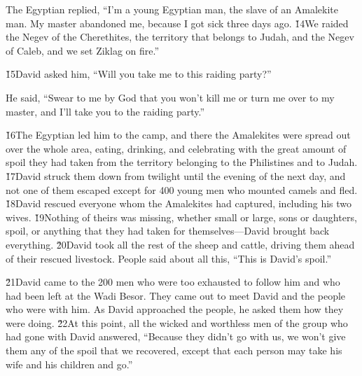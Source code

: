 The Egyptian replied, ``I'm a young Egyptian man, the slave of an Amalekite man. My master abandoned me, because I got sick three days ago. \v{14}We raided the Negev of the Cherethites, the territory that belongs to Judah, and the Negev of Caleb, and we set Ziklag on fire.''

\v{15}David asked him, ``Will you take me to this raiding party?''

He said, ``Swear to me by God that you won't kill me or turn me over to my master, and I'll take you to the raiding party.''

\v{16}The Egyptian led him to the camp, and there the Amalekites were spread out over the whole area, eating, drinking, and celebrating with the great amount of spoil they had taken from the territory belonging to the Philistines and to Judah. \v{17}David struck them down from twilight until the evening of the next day, and not one of them escaped except for 400 young men who mounted camels and fled. \v{18}David rescued everyone whom the Amalekites had captured, including his two wives. \v{19}Nothing of theirs was missing, whether small or large, sons or daughters, spoil, or anything that they had taken for themselves---David brought back everything. \v{20}David took all the rest of the sheep and cattle, driving them ahead of their rescued livestock. People said about all this, ``This is David's spoil.''

\v{21}David came to the 200 men who were too exhausted to follow him and who had been left at the Wadi Besor. They came out to meet David and the people who were with him. As David approached the people, he asked them how they were doing. \v{22}At this point, all the wicked and worthless men of the group who had gone with David answered, ``Because they didn't go with us, we won't give them any of the spoil that we recovered, except that each person may take his wife and his children and go.''

